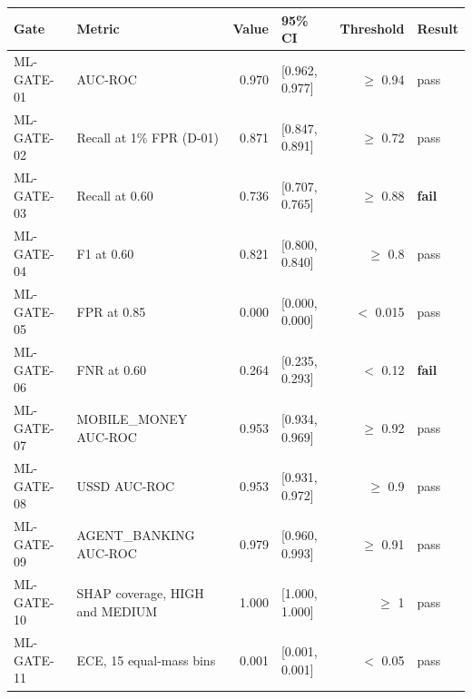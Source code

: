 \begin{tabular}{llrlrl}
\toprule
Gate & Metric & Value & 95\% CI & Threshold & Result \\
\midrule
ML-GATE-01 & AUC-ROC & 0.970 & [0.962, 0.977] & $\geq$ 0.94 & pass \\
ML-GATE-02 & Recall at 1\% FPR (D-01) & 0.871 & [0.847, 0.891] & $\geq$ 0.72 & pass \\
ML-GATE-03 & Recall at 0.60 & 0.736 & [0.707, 0.765] & $\geq$ 0.88 & \textbf{fail} \\
ML-GATE-04 & F1 at 0.60 & 0.821 & [0.800, 0.840] & $\geq$ 0.8 & pass \\
ML-GATE-05 & FPR at 0.85 & 0.000 & [0.000, 0.000] & $<$ 0.015 & pass \\
ML-GATE-06 & FNR at 0.60 & 0.264 & [0.235, 0.293] & $<$ 0.12 & \textbf{fail} \\
ML-GATE-07 & MOBILE_MONEY AUC-ROC & 0.953 & [0.934, 0.969] & $\geq$ 0.92 & pass \\
ML-GATE-08 & USSD AUC-ROC & 0.953 & [0.931, 0.972] & $\geq$ 0.9 & pass \\
ML-GATE-09 & AGENT_BANKING AUC-ROC & 0.979 & [0.960, 0.993] & $\geq$ 0.91 & pass \\
ML-GATE-10 & SHAP coverage, HIGH and MEDIUM & 1.000 & [1.000, 1.000] & $\geq$ 1 & pass \\
ML-GATE-11 & ECE, 15 equal-mass bins & 0.001 & [0.001, 0.001] & $<$ 0.05 & pass \\
\bottomrule
\end{tabular}
